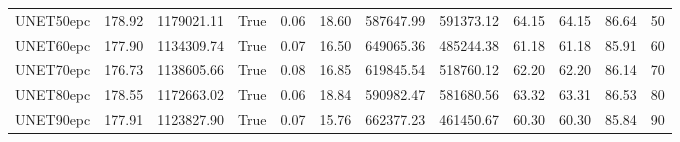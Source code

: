 \begin{tabular}{lrrlrrrrrrrl}
UNET50epc & 178.92 & 1179021.11 & True & 0.06 & 18.60 & 587647.99 & 591373.12 & 64.15 & 64.15 & 86.64 & 50 \\
UNET60epc & 177.90 & 1134309.74 & True & 0.07 & 16.50 & 649065.36 & 485244.38 & 61.18 & 61.18 & 85.91 & 60 \\
UNET70epc & 176.73 & 1138605.66 & True & 0.08 & 16.85 & 619845.54 & 518760.12 & 62.20 & 62.20 & 86.14 & 70 \\
UNET80epc & 178.55 & 1172663.02 & True & 0.06 & 18.84 & 590982.47 & 581680.56 & 63.32 & 63.31 & 86.53 & 80 \\
UNET90epc & 177.91 & 1123827.90 & True & 0.07 & 15.76 & 662377.23 & 461450.67 & 60.30 & 60.30 & 85.84 & 90 \\
\bottomrule
\end{tabular}
